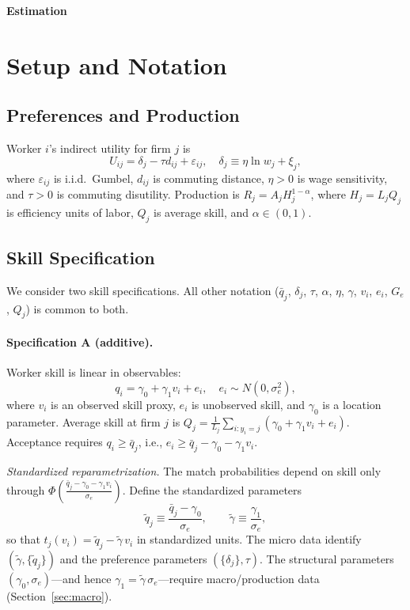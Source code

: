 \documentclass[11pt]{article}
\begin{document}
\begin{center}
{\large \textbf{Estimation}}
\end{center}

\section{Setup and Notation}

\subsection{Preferences and Production}

Worker $i$'s indirect utility for firm $j$ is
\[
U_{ij} = \delta_j - \tau d_{ij} + \varepsilon_{ij}, \quad \delta_j \equiv \eta \ln w_j + \xi_j,
\]
where $\varepsilon_{ij}$ is i.i.d.\ Gumbel, $d_{ij}$ is commuting distance, $\eta>0$ is wage sensitivity, and $\tau>0$ is commuting disutility. Production is $R_j = A_j H_j^{1-\alpha}$, where $H_j = L_j Q_j$ is efficiency units of labor, $Q_j$ is average skill, and $\alpha\in(0,1)$.

\subsection{Skill Specification}

We consider two skill specifications. All other notation ($\bar q_j$, $\delta_j$, $\tau$, $\alpha$, $\eta$, $\gamma$, $v_i$, $e_i$, $G_e$, $Q_j$) is common to both.

\paragraph{Specification A (additive).} Worker skill is linear in observables:
\[
q_i = \gamma_0 + \gamma_1 v_i + e_i, \quad e_i\sim N(0,\sigma_e^2),
\]
where $v_i$ is an observed skill proxy, $e_i$ is unobserved skill, and $\gamma_0$ is a location parameter. Average skill at firm $j$ is $Q_j = \frac{1}{L_j}\sum_{i:y_i=j}(\gamma_0+\gamma_1 v_i + e_i)$. Acceptance requires $q_i \geq \bar q_j$, i.e., $e_i\geq \bar q_j - \gamma_0 - \gamma_1 v_i$.

\medskip\noindent\textit{Standardized reparametrization.} The match probabilities depend on skill only through $\Phi\!\left(\frac{\bar q_j - \gamma_0 - \gamma_1 v_i}{\sigma_e}\right)$. Define the standardized parameters
\[
\tilde q_j \equiv \frac{\bar q_j - \gamma_0}{\sigma_e}, \qquad \tilde\gamma \equiv \frac{\gamma_1}{\sigma_e},
\]
so that $t_j(v_i) = \tilde q_j - \tilde\gamma\, v_i$ in standardized units. The micro data identify $(\tilde\gamma, \{\tilde q_j\})$ and the preference parameters $(\{\delta_j\},\tau)$. The structural parameters $(\gamma_0,\sigma_e)$---and hence $\gamma_1 = \tilde\gamma\,\sigma_e$---require macro/production data (Section~\ref{sec:macro}).
\end{document}
